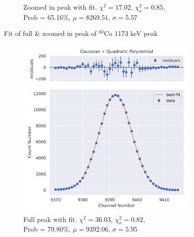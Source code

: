 \documentclass[11pt,a4paper]{article}
\newcommand{\element}[2]{$^{#2}\textrm{#1}$}
\begin{document}
\begin{figure}[H]
\begin{subfigure}{.5\linewidth}
    \caption{Zoomed in peak with fit. $\chi^2 = 17.02$, $\chi^2_\nu = 0.85$, \\ Prob = 65.16\%, $\mu = 8269.51$, $\sigma = 5.57$}
  \end{subfigure}
  \caption{Fit of full \& zoomed in peak of \element{Co}{60} 1173 keV peak}
\end{figure}
\begin{figure}[H]
  \centering
  \begin{subfigure}{.5\linewidth}
    \centering
    \includegraphics[width=\linewidth]{./Images/Cobalt60/Quad/Quad_2_Full.png}
    \caption{Full peak with fit. $\chi^2 = 36.03$, $\chi^2_\nu = 0.82$, \\ Prob = 79.80\%, $\mu = 9392.06$, $\sigma = 5.95$}
  \end{subfigure}%
  \begin{subfigure}{.5\linewidth}
    \centering

\end{subfigure}
\end{figure}
\end{document}
